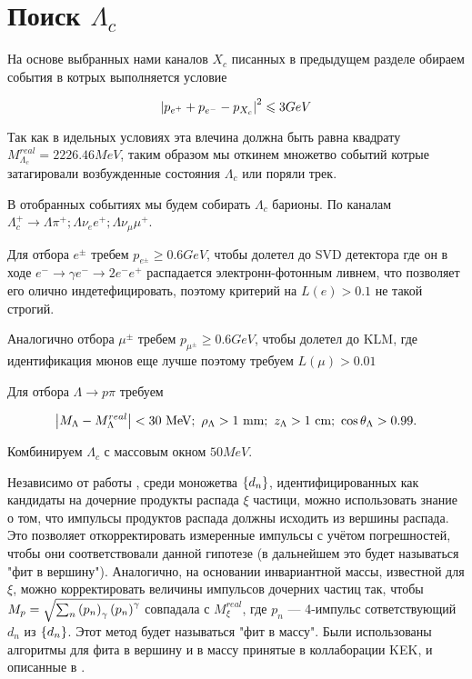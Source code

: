 \section{Поиск $\Lambda_c$}

На основе выбранных нами каналов $X_c$ писанных в предыдущем разделе 
обираем события в котрых выполняется условие 

\begin{equation}
    \abs{p_{e^+} + p_{e^-} - p_{X_c}}^2 \leqslant 3 GeV
\end{equation}

Так как в идельных условиях эта влечина должна быть равна квадрату $M^{real}_{\Lambda_c} = 2226.46 MeV$, 
таким образом мы откинем множетво событий котрые затагировали 
возбужденные состояния $\Lambda_c$ или поряли трек.

В отобранных событиях мы будем собирать $\Lambda_c$ барионы. 
По каналам $\Lambda_c^+ \to \Lambda \pi^+; \Lambda \nu_e e^+; \Lambda \nu_\mu \mu^+$.


\newdot Для отбора $e^\pm$ требем $p_{e^\pm} \geq 0.6 GeV$, чтобы долетел до SVD 
детектора где он в ходе $e^- \to \gamma e^- \to 2e^- e^+$ распадается электронн-фотонным ливнем, 
что позволяет его олично индетефицировать, поэтому критерий на $L(e) > 0.1$ не такой строгий.

\newdot Аналогично отбора $\mu^\pm$ требем $p_{\mu^\pm} \geq 0.6 GeV$, чтобы долетел до KLM, 
где идентификация мюнов еще лучше поэтому требуем $L(\mu) > 0.01$ 

\newdot Для отбора $\Lambda \to p \pi$ требуем 

$$
\abs{ M_{\Lambda} - M^{real}_{\Lambda} } < 30 \text{ MeV}; 
\ \rho_{\Lambda} > 1 \text{ mm}; \ z_{\Lambda} > 1 \text{ cm}; 
\ \cos \theta_{\Lambda} > 0.99.
$$


\newdot Комбинируем $\Lambda_c$ с массовым окном $50 MeV$.

\newdot Независимо от работы \cite{BelleDetector2002}, среди моножетва $\left\{ d_n \right\}$, 
идентифицированных как кандидаты на дочерние продукты распада $\xi$ частици, 
можно использовать знание о том, что импульсы продуктов распада должны исходить 
из вершины распада. Это позволяет откорректировать измеренные импульсы с учётом 
погрешностей, чтобы они соответствовали данной гипотезе (в дальнейшем это будет 
называться "фит в вершину"). Аналогично, на основании инвариантной массы, 
известной для $\xi$, можно корректировать величины импульсов дочерних частиц 
так, чтобы $M_{p} = \sqrt{\sum_n \left( p_n \right)_\gamma \left( p_n \right)^\gamma}$ 
совпадала с $M^{real}_{\xi}$, где $p_n$ --- 4-импульс сответствующий $d_n$ 
из $\left\{ d_n \right\}$. Этот метод будет называться "фит в массу". Были использованы 
алгоритмы для фита в вершину и в массу принятые в коллаборации KEK, и описанные 
в \cite{Krohn2021}.

